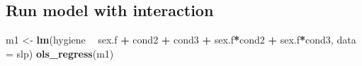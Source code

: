 \documentclass[]{article}
\newenvironment{Shaded}{\begin{snugshade}}{\end{snugshade}}
\newcommand{\KeywordTok}[1]{\textcolor[rgb]{0.13,0.29,0.53}{\textbf{#1}}}
\newcommand{\DataTypeTok}[1]{\textcolor[rgb]{0.13,0.29,0.53}{#1}}
\newcommand{\StringTok}[1]{\textcolor[rgb]{0.31,0.60,0.02}{#1}}
\newcommand{\OperatorTok}[1]{\textcolor[rgb]{0.81,0.36,0.00}{\textbf{#1}}}
\newcommand{\NormalTok}[1]{#1}
\begin{document}
\subsection{Run model with
interaction}\label{run-model-with-interaction}

\begin{Shaded}
\begin{Highlighting}[]
\NormalTok{m1 <-}\StringTok{ }\KeywordTok{lm}\NormalTok{(hygiene }\OperatorTok{~}\StringTok{ }\NormalTok{sex.f }\OperatorTok{+}\StringTok{ }\NormalTok{cond2 }\OperatorTok{+}\StringTok{ }\NormalTok{cond3 }\OperatorTok{+}\StringTok{ }\NormalTok{sex.f}\OperatorTok{*}\NormalTok{cond2 }\OperatorTok{+}\StringTok{ }\NormalTok{sex.f}\OperatorTok{*}\NormalTok{cond3, }\DataTypeTok{data =}\NormalTok{ slp)}
\KeywordTok{ols_regress}\NormalTok{(m1)}
\end{Highlighting}
\end{Shaded}
\end{document}
